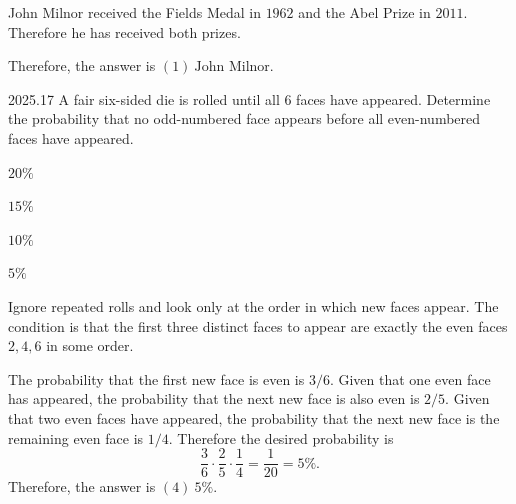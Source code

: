     \begin{solution}
        John Milnor received the Fields Medal in $1962$ and the Abel Prize in $2011$. Therefore he
        has received both prizes.

        Therefore, the answer is $\boxed{(1)\ \text{John Milnor}}$.
    \end{solution}

    \begin{pastproblem}{2025.17}
        A fair six-sided die is rolled until all $6$ faces have appeared. Determine the probability
        that no odd-numbered face appears before all even-numbered faces have appeared.
        \begin{problemchoices}
            \item \(20\%\)
            \item \(15\%\)
            \item \(10\%\)
            \item \(5\%\)
        \end{problemchoices}
    \end{pastproblem}

    \begin{solution}
        Ignore repeated rolls and look only at the order in which new faces appear. The condition is
        that the first three distinct faces to appear are exactly the even faces $2,4,6$ in some
        order.

        The probability that the first new face is even is $3/6$. Given that one even face has
        appeared, the probability that the next new face is also even is $2/5$. Given that two even
        faces have appeared, the probability that the next new face is the remaining even face is
        $1/4$. Therefore the desired probability is
        \[
            \frac36\cdot\frac25\cdot\frac14
            =
            \frac1{20}
            =
            5\%.
        \]
        Therefore, the answer is $\boxed{(4)\ 5\%}$.
    \end{solution}

